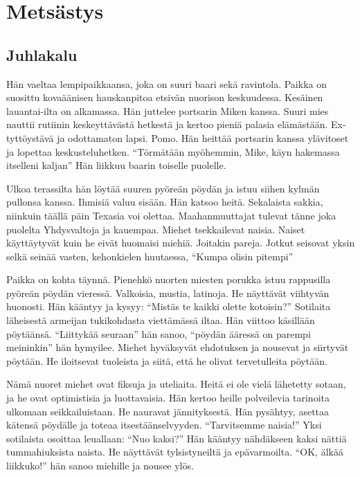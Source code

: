 \chapter{Metsästys}

\section{Juhlakalu}

\begin{tarina}

Hän vaeltaa lempipaikkaansa, joka on suuri baari sekä ravintola. Paikka on suosittu kovaäänisen hauskanpitoa etsivän nuorison keskuudessa. Kesäinen lauantai-ilta on alkamassa. Hän juttelee portsarin Miken kanssa. Suuri mies nauttii rutiinin keskeyttävästä hetkestä ja kertoo pieniä palasia elämästään. Ex-tyttöystävä ja odottamaton lapsi. Pomo. Hän heittää portsarin kanssa ylävitoset ja lopettaa keskusteluhetken. ``Törmätään myöhemmin, Mike, käyn hakemassa itselleni kaljan'' Hän liikkuu baarin toiselle puolelle.

Ulkoa terassilta hän löytää suuren pyöreän pöydän ja istuu siihen kylmän pullonsa kanssa. Ihmisiä valuu sisään. Hän katsoo heitä. Sekalaista sakkia, niinkuin täällä päin Texasia voi olettaa. Maahanmuuttajat tulevat tänne joka puolelta Yhdysvaltoja ja kauempaa. Miehet tsekkailevat naisia. Naiset käyttäytyvät kuin he eivät huomaisi miehiä. Joitakin pareja. Jotkut seisovat yksin selkä seinää vasten, kehonkielen huutaessa, ``Kumpa olisin pitempi''

Paikka on kohta täynnä. Pienehkö nuorten miesten porukka istuu rappusilla pyöreän pöydän vieressä. Valkoisia, mustia, latinoja. He näyttävät viihtyvän huonosti. Hän kääntyy ja kysyy: ``Mistäs te kaikki olette kotoisin?'' Sotilaita läheisestä armeijan tukikohdasta viettämässä iltaa. Hän viittoo käsillään pöytäänsä. ``Liittykää seuraan\vmq{,}'' hän sanoo, ``pöydän ääressä on parempi meininkin\vmq{,}'' hän hymyilee. Miehet hyväksyvät ehdotuksen ja nousevat ja siirtyvät pöytään. He iloitsevat tuoleista ja siitä, että he olivat tervetulleita pöytään.

Nämä nuoret miehet ovat fiksuja ja uteliaita. Heitä ei ole vielä lähetetty sotaan, ja he ovat optimistisia ja luottavaisia. Hän kertoo heille polveilevia tarinoita ulkomaan seikkailuistaan. He nauravat jännityksestä. Hän pysähtyy, asettaa kätensä pöydälle ja toteaa itsestäänselvyyden. ``Tarvitsemme naisia!'' Yksi sotilaista osoittaa leuallaan: ``Nuo kaksi?'' Hän kääntyy nähdäkseen kaksi nättiä tummahiuksista naista. He näyttävät tylsistyneiltä ja epävarmoilta. ``OK, älkää liikkuko!'' hän sanoo miehille ja nousee ylös.


\end{tarina}
